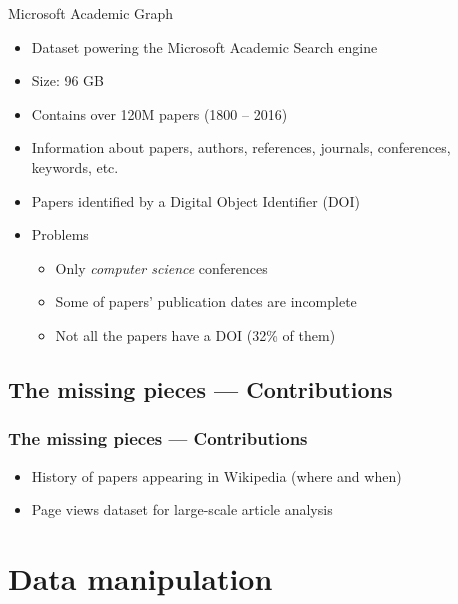 \documentclass{beamer}
\begin{document}
\begin{frame}{Microsoft Academic Graph}
    \begin{itemize}
        \item Dataset powering the Microsoft Academic Search engine
        \item Size: 96 GB
        \item Contains over 120M papers (1800 -- 2016)
        \item Information about papers, authors, references, journals, conferences, keywords, etc.
        \item Papers identified by a Digital Object Identifier (DOI)
        \item Problems
        \begin{itemize}
            \item Only \emph{computer science} conferences
            \item Some of papers' publication dates are incomplete
            \item Not all the papers have a DOI (32\% of them)
        \end{itemize}
    \end{itemize}
\end{frame}

\subsection{The missing pieces --- Contributions}
\begin{frame}
\frametitle{The missing pieces --- Contributions}
\begin{itemize}
    \item History of papers appearing in Wikipedia (where and when)
    \item Page views dataset for large-scale article analysis
\end{itemize}
\end{frame}

\section{Data manipulation}
\end{document}
